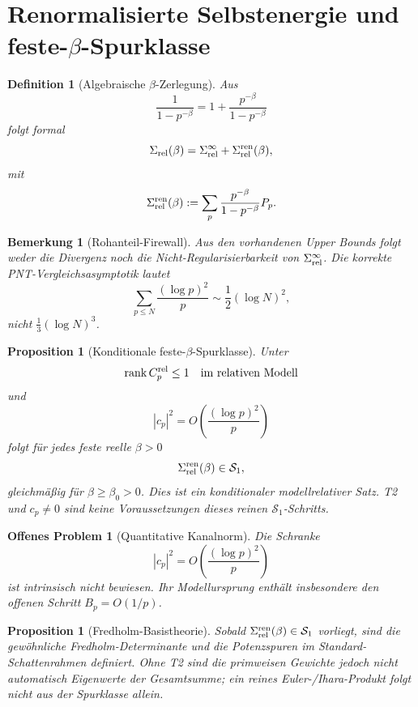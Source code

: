 \documentclass[11pt,a4paper]{amsart}
\newtheorem{proposition}[theorem]{Proposition}
\newtheorem{definition}[theorem]{Definition}
\newtheorem{remark}[theorem]{Bemerkung}
\newtheorem{openproblem}[theorem]{Offenes Problem}
\begin{document}
\section{Renormalisierte Selbstenergie und feste-$\beta$-Spurklasse}

\begin{definition}[Algebraische $\beta$-Zerlegung]\label{def:beta-split}
Aus
\[
  \frac1{1-p^{-\beta}}
  =1+\frac{p^{-\beta}}{1-p^{-\beta}}
\]
folgt formal
\[
  \Sigma_{\rm rel}(\beta)
  =\Sigma_{\rm rel}^{\infty}+\Sigma_{\rm rel}^{\rm ren}(\beta),
\]
mit
\[
  \Sigma_{\rm rel}^{\rm ren}(\beta)
  :=\sum_p\frac{p^{-\beta}}{1-p^{-\beta}}P_p.
\]
\end{definition}

\begin{remark}[Rohanteil-Firewall]\label{rem:raw-firewall}
Aus den vorhandenen Upper Bounds folgt weder die Divergenz noch die
Nicht-Regularisierbarkeit von $\Sigma_{\rm rel}^{\infty}$. Die korrekte
PNT-Vergleichsasymptotik lautet
\[
  \sum_{p\le N}\frac{(\log p)^2}{p}
  \sim\frac12(\log N)^2,
\]
nicht $\frac13(\log N)^3$.
\end{remark}

\begin{proposition}[Konditionale feste-$\beta$-Spurklasse]
\label{prop:s1-fixed-beta}
Unter
\[
  \operatorname{rank}C_p^{\rm rel}\le1
  \quad\text{im relativen Modell}
\]
und
\[
  |c_p|^2=O\!\left(\frac{(\log p)^2}{p}\right)
\]
folgt für jedes feste reelle $\beta>0$
\[
  \Sigma_{\rm rel}^{\rm ren}(\beta)\in\mathcal S_1,
\]
gleichmäßig für $\beta\ge\beta_0>0$. Dies ist ein konditionaler
modellrelativer Satz. T2 und $c_p\ne0$ sind keine Voraussetzungen dieses
reinen $\mathcal S_1$-Schritts.
\end{proposition}

\begin{openproblem}[Quantitative Kanalnorm]\label{op:cp-bound}
Die Schranke
\[
  |c_p|^2=O\!\left(\frac{(\log p)^2}{p}\right)
\]
ist intrinsisch nicht bewiesen. Ihr Modellursprung enthält insbesondere den
offenen Schritt $B_p=O(1/p)$.
\end{openproblem}

\begin{proposition}[Fredholm-Basistheorie]\label{prop:fredholm-base}
Sobald $\Sigma_{\rm rel}^{\rm ren}(\beta)\in\mathcal S_1$ vorliegt, sind die
gewöhnliche Fredholm-Determinante und die Potenzspuren im
Standard-Schattenrahmen definiert. Ohne T2 sind die primweisen Gewichte jedoch
nicht automatisch Eigenwerte der Gesamtsumme; ein reines Euler-/Ihara-Produkt
folgt nicht aus der Spurklasse allein.
\end{proposition}
\end{document}
